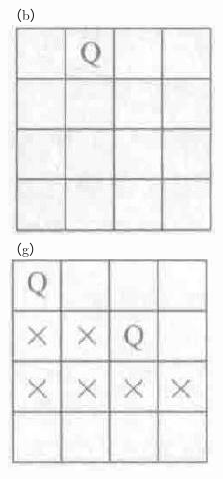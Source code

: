 \documentclass[10pt]{article}
\begin{document}
（b）\\
\includegraphics[max width=\textwidth, center]{2025_06_06_704745ea57b15b2333e5g-135}\\
（g）\\
\includegraphics[max width=\textwidth, center]{2025_06_06_704745ea57b15b2333e5g-135(8)}\\
\end{document}
